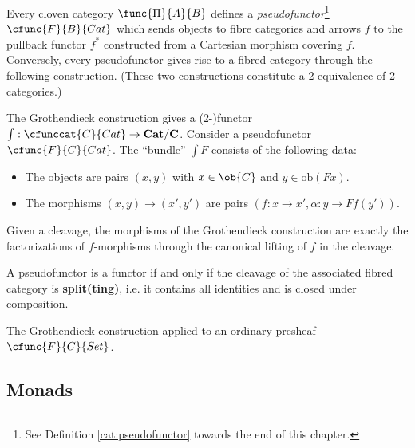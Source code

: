     \begin{property}
        Every cloven category $\func{\Pi}{A}{B}$ defines a \textit{pseudofunctor}\footnote{See Definition \ref{cat:pseudofunctor} towards the end of this chapter.} $\cfunc{F}{B}{Cat}$ which sends objects to fibre categories and arrows $f$ to the pullback functor $f^*$ constructed from a Cartesian morphism covering $f$. Conversely, every pseudofunctor gives rise to a fibred category through the following construction. (These two constructions constitute a 2-equivalence of 2-categories.)

        The Grothendieck construction gives a (2-)functor $\int:\cfunccat{C}{Cat}\rightarrow\mathbf{Cat}/\mathbf{C}$. Consider a pseudofunctor $\cfunc{F}{C}{Cat}$. The ``bundle'' $\int\!F$ consists of the following data:
        \begin{itemize}
            \item The objects are pairs $(x,y)$ with $x\in\ob{C}$ and $y\in\mathrm{ob}(Fx)$.
            \item The morphisms $(x,y)\rightarrow(x',y')$ are pairs $(f:x\rightarrow x',\alpha:y\rightarrow Ff(y'))$.
        \end{itemize}
        Given a cleavage, the morphisms of the Grothendieck construction are exactly the factorizations of $f$-morphisms through the canonical lifting of $f$ in the cleavage.
    \end{property}
    \begin{property}[Functors]
        A pseudofunctor is a functor if and only if the cleavage of the associated fibred category is \textbf{split(ting)}, i.e. it contains all identities and is closed under composition.
    \end{property}
    \begin{example}
        The Grothendieck construction applied to an ordinary presheaf $\cfunc{F}{C}{Set}$.
    \end{example}

\subsection{Monads}

